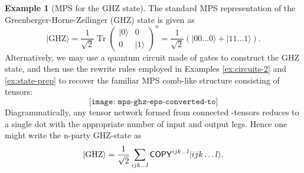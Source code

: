 \documentclass[aps,pra,12pt,nofootinbib,superscriptaddress,longbibliography]{revtex4-1}
\DeclareMathOperator{\trace}{Tr}  %
\newcommand{\yo}[1]{\todo{{\textbf{[}JB: #1\textbf{]}}}}
\newcommand{\jb}[1]{\todo[inline]{{\textbf{[}JB: #1\textbf{]}}}}
\theoremstyle{plain}
\theoremstyle{definition}
\newtheorem{example}[theorem]{Example}
\newcommand{\ket}[1]{\mbox{$|#1\rangle$}}
\newcommand{\cnot}{{\sf{CNOT}}}
\newcommand{\COPY}{{\sf{COPY}}}
\newcommand{\be}{\begin{equation}}
\newcommand{\ee}{\end{equation}}
\begin{document}
\begin{example}[MPS for the GHZ state]\label{ex:mps-ghz}
The standard MPS representation of the Greenberger-Horne-Zeilinger (GHZ) state is given as 
\be\label{eqn:ghzMPS}
\ket{\text{GHZ}} = \frac{1}{\sqrt{2}}\trace\left( \begin{array}{cc}
\ket{0} & 0 \\
0 & \ket{1} \end{array} \right)^{n}=
\frac{1}{\sqrt{2}}(\ket{00\ldots 0}+\ket{11\ldots 1}).
\ee
Alternatively, we may use a quantum circuit made of \cnot{} gates to construct
the GHZ state,
and then use the rewrite rules employed in Examples \ref{ex:circuits-2} and \ref{ex:state-prep}
to recover the familiar MPS comb-like structure consisting of \COPY{} tensors:
\be
\texttt{[image: mps-ghz-eps-converted-to]}
\ee 
Diagrammatically, any tensor network formed from connected \COPY{}-tensors reduces to a single dot
with the appropriate number of input and output legs.
Hence one might write the n-party GHZ-state as 
\be 
\ket{\text{GHZ}} = \frac{1}{\sqrt{2}}\sum_{ijk\ldots l} \COPY^{ijk\ldots l}\ket{ijk\ldots l}.
\ee 
\end{example}


\end{document}
